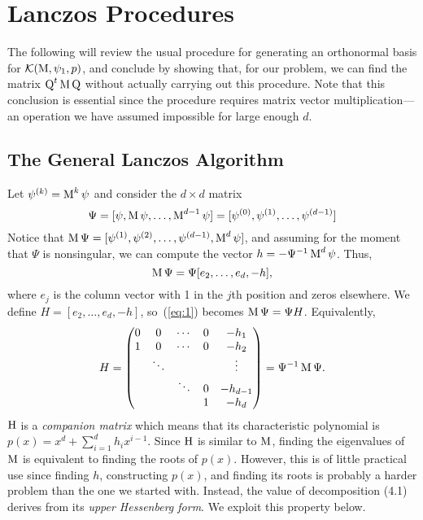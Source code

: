 \chapter{Lanczos Procedures}

The following will review the usual procedure for generating an orthonormal basis for
$\mathcal{K}(\operatorname{M}, \psi_1, p)$, 
and conclude by showing that, for our problem, we can find the matrix 
$\operatorname{Q}^t\operatorname{M}\operatorname{Q}$
without actually carrying out this procedure. Note that this conclusion is essential since the procedure
requires matrix vector multiplication---an operation we have assumed impossible for large enough $d$.

\section{The General Lanczos Algorithm}
\label{sec:gener-lancz-algor}
Let $\psi^{(k)} =  \operatorname{M}^k \psi$ and consider the $d\times d$ matrix
\[
\Psi = [\psi, \operatorname{M}\psi, \dots, \operatorname{M}^{d-1}\psi] = [\psi^{(0)}, \psi^{(1)}, \dots, \psi^{(d-1)}]
\]
Notice that $\operatorname{M}\Psi = [\psi^{(1)}, \psi^{(2)}, \dots, \psi^{(d-1)}, \operatorname{M}^d \psi]$,
and assuming for the moment that $\Psi$ is nonsingular,
we can compute the vector $h = -\Psi^{-1}\operatorname{M}^d \psi$. Thus,
\begin{equation}
\label{eq:1}
\operatorname{M}\Psi = \Psi [e_2,\dots,e_d,-h],  
\end{equation}
where $e_j$ is the column vector with 1 in
the $j$th position and zeros elsewhere. We define $H = [e_2,\dots,e_d,-h]$,
so~(\ref{eq:1}) becomes $\operatorname{M}\Psi = \Psi H$.
%
%
%
%
Equivalently,
\begin{equation}
  \label{eq:4.1}
H = 
\begin{pmatrix}
0 & 0      & \cdots & 0 & -h_1 \\
1 & 0      & \cdots & 0 & -h_2\\
  & \ddots &        &   & \vdots \\
  &        & \ddots & 0 & -h_{d-1}\\
  &        &        & 1 & -h_{d}
\end{pmatrix} = \Psi^{-1} \operatorname{M} \Psi.
\end{equation}
$\operatorname{H}$ is a \emph{companion matrix} which means that its characteristic polynomial
is $p(x) = x^d + \sum_{i=1}^d h_i x^{i-1}$.
Since $\operatorname{H}$ is similar to $\operatorname{M}$, finding the eigenvalues of $\operatorname{M}$ is equivalent to
finding the roots of $p(x)$. However, this is of little practical use since
finding $h$, constructing $p(x)$, and finding its roots is 
probably a harder problem than the one we started with. Instead, the value of decomposition (4.1)
derives from its \emph{upper Hessenberg form}. We exploit this property below.

